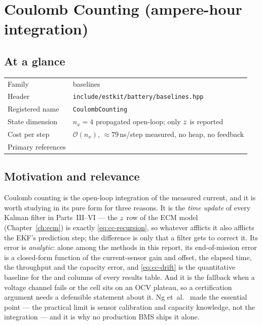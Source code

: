 \chapter{Coulomb Counting (ampere-hour integration)}
\label{ch:coulombcounting}

\section*{At a glance}
\begin{tabular}{@{}l>{\raggedright\arraybackslash}p{}@{}}
Family & baselines \\
Header & \texttt{include/estkit/battery/baselines.hpp} \\
Registered name & \texttt{CoulombCounting} \\
State dimension & $n_x = 4$ propagated open-loop; only $z$ is reported \\
Cost per step & $\mathcal{O}(n_x)$, $\approx 79$\,ns/step measured, no heap, no feedback \\
Primary references & \cite{ng2009coulomb,plett2015bms1,lin2018sensorbias} \\
\end{tabular}

\section{Motivation and relevance}
Coulomb counting is the open-loop integration of the measured current, and it is worth studying in
its pure form for three reasons. It is the \emph{time update} of every Kalman filter in
Parts~III--VI --- the $z$ row of the ECM model (Chapter~\ref{ch:ecm}) is exactly
\eqref{eq:cc-recursion}, so whatever afflicts it also afflicts the EKF's prediction step; the
difference is only that a filter gets to correct it. Its error is \emph{analytic}: alone among the
methods in this report, its end-of-mission error is a closed-form function of the current-sensor
gain and offset, the elapsed time, the throughput and the capacity error, and \eqref{eq:cc-drift}
is the quantitative baseline for the  and  columns of every
results table. And it is the fallback when a voltage channel fails or the cell sits on an OCV
plateau, so a certification argument needs a defensible statement about it. Ng
et~al.~\cite{ng2009coulomb} made the essential point --- the practical limit is sensor calibration
and capacity knowledge, not the integration --- and it is why no production BMS ships it alone.

